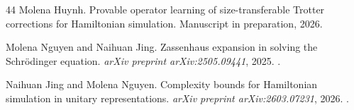 \documentclass[11pt]{article}
\begin{document}
\begin{thebibliography}{44}
Molena Huynh.
\newblock Provable operator learning of size-transferable {Trotter}
  corrections for {Hamiltonian} simulation.
\newblock Manuscript in preparation, 2026.

Molena Nguyen and Naihuan Jing.
\newblock Zassenhaus expansion in solving the {Schr\"odinger} equation.
\newblock \emph{arXiv preprint arXiv:2505.09441}, 2025.
\newblock {}.

Naihuan Jing and Molena Nguyen.
\newblock Complexity bounds for {Hamiltonian} simulation in unitary
  representations.
\newblock \emph{arXiv preprint arXiv:2603.07231}, 2026.
\newblock {}.

\end{thebibliography}
\end{document}
